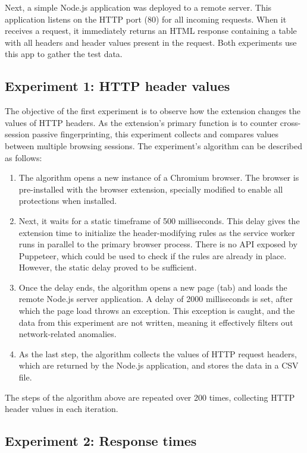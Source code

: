 Next, a simple Node.js application was deployed to a remote server. This application listens on the HTTP port (80) for all incoming requests. When it receives a request, it immediately returns an HTML response containing a table with all headers and header values present in the request. Both experiments use this app to gather the test data.

\subsection{Experiment 1: HTTP header values}

The objective of the first experiment is to observe how the extension changes the values of HTTP headers. As the extension's primary function is to counter cross-session passive fingerprinting, this experiment collects and compares values between multiple browsing sessions. The experiment's algorithm can be described as follows:

\begin{enumerate}
	\item The algorithm opens a new instance of a Chromium browser. The browser is pre-installed with the browser extension, specially modified to enable all protections when installed.
	\item Next, it waits for a static timeframe of 500 milliseconds. This delay gives the extension time to initialize the header-modifying rules as the service worker runs in parallel to the primary browser process. There is no API exposed by Puppeteer, which could be used to check if the rules are already in place. However, the static delay proved to be sufficient.
	\item Once the delay ends, the algorithm opens a new page (tab) and loads the remote Node.js server application. A delay of 2000 milliseconds is set, after which the page load throws an exception. This exception is caught, and the data from this experiment are not written, meaning it effectively filters out network-related anomalies.
	\item As the last step, the algorithm collects the values of HTTP request headers, which are returned by the Node.js application, and stores the data in a CSV file.
\end{enumerate}

The steps of the algorithm above are repeated over 200 times, collecting HTTP header values in each iteration.

\subsection{Experiment 2: Response times}

